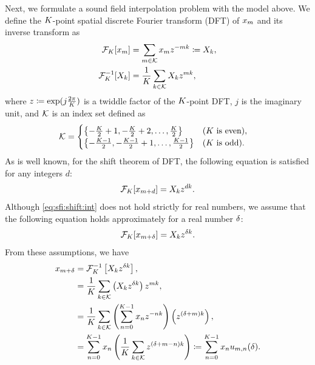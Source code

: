 \documentclass[sip,biber]{now-journal}
\begin{document}
Next, we formulate a sound field interpolation problem with the model above.
We define the $K$-point spatial discrete Fourier transform (DFT) of $x _{m}$ and its inverse transform as
\begin{align}
  \dft _{\Src} [\sfcma _{\mic}] &= \sum _{\mic \in \SRC} \sfcma _{\mic} \twid ^{-\mic\src} \coloneqq \Sfcma _{\src},\\
  \dft _{\Src} ^{-1} [\Sfcma _{\src}] &= \frac{1}{\Mic} \sum _{\src \in \SRC} \Sfcma _{\src} \twid ^{\mic\src},%
\end{align}
where $z \coloneqq \exp (j \frac{2\pi}{K})$ is a twiddle factor of the $K$-point DFT, $j$ is the imaginary unit, and $\mathcal{K}$ is an index set defined as
\begin{align}
  \mathcal{K} &=
  \begin{cases}
    \left\{-\frac{K}{2} + 1, -\frac{K}{2} + 2, \dots, \frac{K}{2}\right\} & \text{($K$ is even)}, \\
    \left\{-\frac{K - 1}{2}, -\frac{K - 1}{2} + 1, \dots, \frac{K - 1}{2}\right\} & \text{($K$ is odd)}.
  \end{cases}
\end{align}
As is well known, for the shift theorem of DFT, the following equation is satisfied for any integers $d$:
\begin{equation}
  \dft _{\Src} [\sfcma _{\mic + d}] = \Sfcma _{\src} \twid ^{d \src}.%
  \label{eq:sfi:shift:int}
\end{equation}
Although \eqref{eq:sfi:shift:int} does not hold strictly for real numbers, we assume that the following equation holds approximately for a real number $\delta$:
\begin{equation}
  \dft _{\Src} [\sfcma _{\mic + \rotSmpl}] = \Sfcma _{\src} \twid ^{\rotSmpl \src}.%
  \label{eq:sfi:shift:dft}
\end{equation}
From these assumptions, we have
\begin{align}
  x _{m + \delta} &= \mathcal{F} _{K} ^{-1} \left[X _{k} z ^{\delta k}\right], \\
                            &= \frac{1}{K} \sum _{k \in \mathcal{K}} \left(X _{k}z ^{\delta k} \right) z ^{mk}, \\
                            &= \frac{1}{K} \sum _{k \in \mathcal{K}} \left(\sum _{n=0} ^{K - 1} x _{n} z ^{-nk}\right) \left( z ^{(\delta + m)k} \right), \\
                            &= \sum _{n = 0} ^{K - 1} x _{n} \left( \frac{1}{K} \sum _{k \in \mathcal{K}} z ^{(\delta + m - n)k} \right)
                            \coloneqq \sum _{n = 0} ^{K - 1} x _{n} u _{m, n}(\delta) \label{eq:sfi:elem}.
\end{align}
\end{document}
